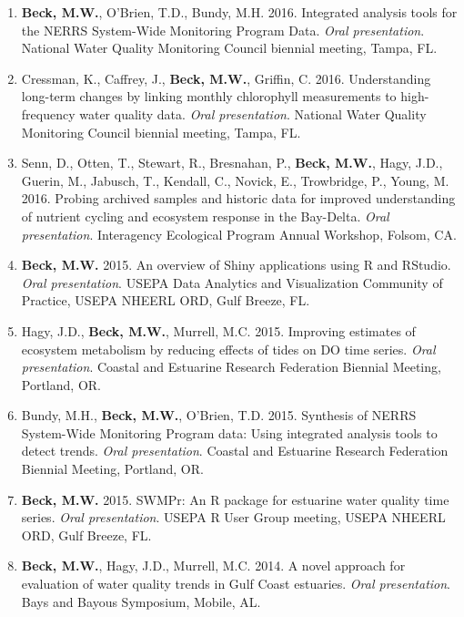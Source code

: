 \documentclass[letterpaper,12pt]{article}
\begin{document}
\begin{enumerate}
\item {\bf Beck, M.W.}, O'Brien, T.D., Bundy, M.H. 2016. Integrated analysis tools for the NERRS System-Wide Monitoring Program Data. \textit{Oral presentation}. National Water Quality Monitoring Council biennial meeting, Tampa, FL.

\item Cressman, K., Caffrey, J., {\bf Beck, M.W.}, Griffin, C. 2016. Understanding long-term changes by linking monthly chlorophyll measurements to high-frequency water quality data. \textit{Oral presentation}. National Water Quality Monitoring Council biennial meeting, Tampa, FL.

\item Senn, D., Otten, T., Stewart, R., Bresnahan, P., {\bf Beck, M.W.}, Hagy, J.D., Guerin, M., Jabusch, T., Kendall, C., Novick, E., Trowbridge, P., Young, M. 2016. Probing archived samples and historic data for improved understanding of nutrient cycling and ecosystem response in the Bay-Delta. \textit{Oral presentation}. Interagency Ecological Program Annual Workshop, Folsom, CA.

\item {\bf Beck, M.W.} 2015. An overview of Shiny applications using R and RStudio. \textit{Oral presentation}. USEPA Data Analytics and Visualization Community of Practice, USEPA NHEERL ORD, Gulf Breeze, FL.

\item Hagy, J.D., {\bf Beck, M.W.}, Murrell, M.C. 2015. Improving estimates of ecosystem metabolism by reducing effects of tides on DO time series. \textit{Oral presentation}. Coastal and Estuarine Research Federation Biennial Meeting, Portland, OR. 

\item Bundy, M.H., {\bf Beck, M.W.}, O'Brien, T.D. 2015. Synthesis of NERRS System-Wide Monitoring Program data: Using integrated analysis tools to detect trends. \textit{Oral presentation}. Coastal and Estuarine Research Federation Biennial Meeting, Portland, OR.

\item {\bf Beck, M.W.} 2015. SWMPr: An R package for estuarine water quality time series. \textit{Oral presentation}. USEPA R User Group meeting, USEPA NHEERL ORD, Gulf Breeze, FL.

\item {\bf Beck, M.W.}, Hagy, J.D., Murrell, M.C. 2014. A novel approach for evaluation of water quality trends in Gulf Coast estuaries. \textit{Oral presentation}. Bays and Bayous Symposium, Mobile, AL.


\end{enumerate}
\end{document}
